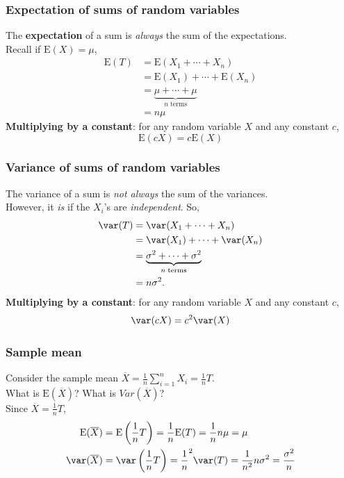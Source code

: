 \documentclass[a4paper]{article}
\begin{document}
\subsubsection{Expectation of sums of random variables}
The \textbf{expectation} of a sum is \textit{always} the sum of the expectations.\\
Recall if \( \mathrm{E}(X) = \mu \),
\begin{align*}
	\mathrm{\mathrm{E}}(T) &= \mathrm{\mathrm{E}}(X_1 + \dotsb + X_n)\\
				  &= \mathrm{\mathrm{E}}(X_1) + \dotsb + \mathrm{\mathrm{E}}(X_n)\\
				  &= \underbrace{\mu + \dotsb + \mu}_{n\;\text{terms}}\\
				  &= n \mu
\end{align*}
\textbf{Multiplying by a constant}: for any random variable \( X \) and any constant \( c \),
\[
	\mathrm{\mathrm{E}}(cX) = c\mathrm{\mathrm{E}}(X)
\]
\subsubsection{Variance of sums of random variables}
The variance of a sum is \textit{not always} the sum of the variances.\\
However, it \textit{is} if the \( X_i \)'s are \textit{independent}. So,
\begin{align*}
	\var(T) &= \var(X_1 + \dotsb + X_n)\\
				  &= \var(X_1) + \dotsb + \var(X_n)\\
				  &= \underbrace{\sigma^2 + \dotsb + \sigma^{2}}_{n\;\text{terms}}\\
				  &= n \sigma^{2}.
\end{align*}
\textbf{Multiplying by a constant}: for any random variable \( X \) and any constant \( c \),
\[
	\var(cX) = c^{2}\var(X)
\]
\subsubsection{Sample mean}
Consider the sample mean \( \overline{X} = \frac{1}{n}\sum_{i=1}^{n} X_i = \frac{1}{n} T \).\\
What is \( \mathrm{\mathrm{E}}(\overline{X}) \)? What is \( Var(\overline{X}) \)?\\
Since \( \overline{X} = \frac{1}{n}T \),
\begin{align*}
	\mathrm{\mathrm{E}}(\overline{X}) &= \mathrm{\mathrm{E}}\left( \frac{1}{n} T \right) = \frac{1}{n} \mathrm{\mathrm{E}}(T) = \frac{1}{n} n \mu = \mu\\
	\var(\overline{X}) &= \var\left( \frac{1}{n} T \right) = \frac{1}{n}^{2} \var(T) = \frac{1}{n^{2}} n \sigma^{2} = \frac{\sigma^{2}}{n}
\end{align*}
\end{document}
